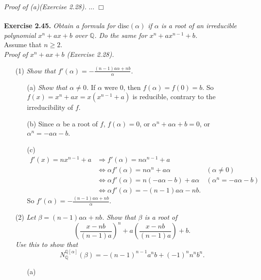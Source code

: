 \documentclass{article}
\begin{document}
\emph{Proof of (a)(Exercise 2.28).}
...
$\Box$ \\\\






\textbf{Exercise 2.45.}
\emph{Obtain a formula for $\text{disc}(\alpha)$ if $\alpha$ is a root of
an irreducible polynomial $x^n + ax + b$ over $\mathbb{Q}$.
Do the same for $x^n + ax^{n-1}+b$.} \\

Assume that $n \geq 2$. \\

\emph{Proof of $x^n + ax + b$ (Exercise 2.28).}
\begin{enumerate}
\item[(1)]
\emph{Show that $f'(\alpha) = -\frac{(n-1)a\alpha+nb}{\alpha}$.}
  \begin{enumerate}
  \item[(a)]
  \emph{Show that $\alpha \neq 0$.}
  If $\alpha$ were $0$, then $f(\alpha) = f(0) = b$.
  So $f(x) = x^n+ax = x(x^{n-1}+a)$ is reducible, contrary to the irreducibility of $f$.
  \item[(b)]
  Since $\alpha$ be a root of $f$,
  $f(\alpha) = 0$,
  or $\alpha^n + a\alpha + b = 0$,
  or $\alpha^n = -a\alpha-b$.
  \item[(c)]
  \begin{align*}
  f'(x) = nx^{n-1} + a
  &\Longrightarrow
  f'(\alpha) = n\alpha^{n-1} + a \\
  &\Longleftrightarrow
  \alpha f'(\alpha) = n\alpha^n + a\alpha
    &(\alpha \neq 0) \\
  &\Longleftrightarrow
  \alpha f'(\alpha) = n(-a\alpha-b) + a\alpha
    &(\alpha^n = -a\alpha-b) \\
  &\Longleftrightarrow
  \alpha f'(\alpha) = -(n-1)a\alpha-nb.
  \end{align*}
  So $f'(\alpha) = -\frac{(n-1)a\alpha+nb}{\alpha}$.
  \end{enumerate}
\item[(2)]
\emph{
Let $\beta = (n-1)a\alpha+nb$.
Show that $\beta$ is a root of
$$\left( \frac{x-nb}{(n-1)a} \right)^n + a\left( \frac{x-nb}{(n-1)a} \right) + b.$$
Use this to show that
$$N_{\mathbb{Q}}^{\mathbb{Q}[\alpha]}(\beta) = -(n-1)^{n-1}a^nb+(-1)^n n^n b^n.$$}
  \begin{enumerate}
  \item[(a)]

\end{enumerate}
\end{enumerate}
\end{document}
